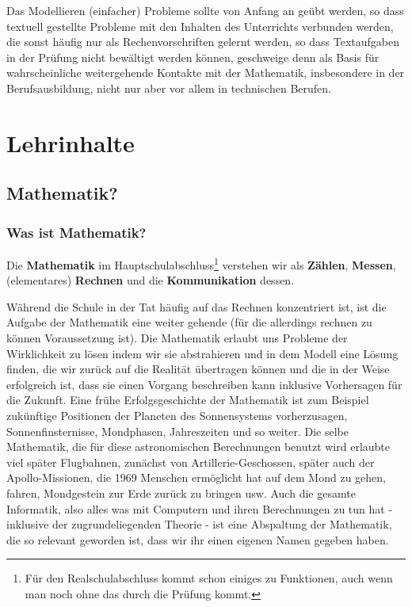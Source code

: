 \documentclass[a4paper]{book}%
\theoremstyle{definition}
\begin{document}
Das Modellieren (einfacher) Probleme sollte von Anfang an geübt werden, so dass textuell gestellte Probleme mit den Inhalten des Unterrichts verbunden werden, die sonst häufig nur als Rechenvorschriften gelernt werden, so dass Textaufgaben in der Prüfung nicht bewältigt werden können, geschweige denn als Basis für wahrscheinliche weitergehende Kontakte mit der Mathematik, insbesondere in der Berufsausbildung, nicht nur aber vor allem in technischen Berufen.


\part{Lehrinhalte}

\chapter{Mathematik?}

\section{Was ist Mathematik?}

Die \textbf{Mathematik} im Hauptschulabschluss\footnote{Für den Realschulabschluss kommt schon einiges zu Funktionen, auch wenn man noch ohne das durch die Prüfung kommt.} verstehen wir als \textbf{Zählen}, \textbf{Messen}, (elementares) \textbf{Rechnen} und die \textbf{Kommunikation} dessen.

Während die Schule in der Tat häufig auf das Rechnen konzentriert ist, ist die Aufgabe der Mathematik eine weiter gehende (für die allerdings rechnen zu können Voraussetzung ist). Die Mathematik erlaubt uns Probleme der Wirklichkeit zu lösen indem wir sie abstrahieren und in dem Modell eine Lösung finden, die wir zurück auf die Realität übertragen können und die in der Weise erfolgreich ist, dass sie einen Vorgang beschreiben kann inklusive Vorhersagen für die Zukunft. Eine frühe Erfolgsgeschichte der Mathematik ist zum Beispiel zukünftige Positionen der Planeten des Sonnensystems vorherzusagen, Sonnenfinsternisse, Mondphasen, Jahreszeiten und so weiter. Die selbe Mathematik, die für diese astronomischen Berechnungen benutzt wird erlaubte viel später Flugbahnen, zunächst von Artillerie-Geschossen, später auch der Apollo-Missionen, die 1969 Menschen ermöglicht hat auf dem Mond zu gehen, fahren, Mondgestein zur Erde zurück zu bringen usw. Auch die gesamte Informatik, also alles was mit Computern und ihren Berechnungen zu tun hat - inklusive der zugrundeliegenden Theorie - ist eine Abspaltung der Mathematik, die so relevant geworden ist, dass wir ihr einen eigenen Namen gegeben haben.
\end{document}
